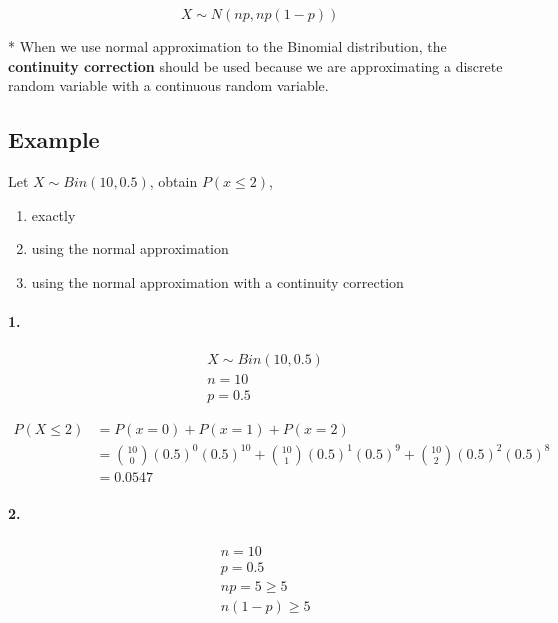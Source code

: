 \documentclass{article}
\begin{document}
    \begin{equation*}
        X \sim N(np, np(1-p))
    \end{equation*}

    * When we use normal approximation to the Binomial distribution, the \textbf{continuity correction} 
    should be used because we are approximating a discrete random variable with a continuous random variable.

    \subsection*{Example}
    Let $X \sim Bin(10, 0.5)$, obtain $P(x\leq 2)$,
    \begin{enumerate}
        \item exactly
        \item using the normal approximation
        \item using the normal approximation with a continuity correction
    \end{enumerate}

    \paragraph{1.}

    \begin{align*}
        &X \sim Bin(10, 0.5)\\
        &n = 10\\
        &p = 0.5
    \end{align*}

    \begin{align*}
        P(X \leq 2) &=  P(x = 0) + P(x = 1) + P(x = 2)\\
        & = {10 \choose 0 }(0.5)^{0}(0.5)^{10} + {10 \choose 1} (0.5)^{1}(0.5)^{9} + {10 \choose 2} (0.5)^{2}(0.5)^{8}\\
        & = 0.0547
    \end{align*}

    \paragraph{2.}
    \begin{align*}
        &n = 10\\
        &p = 0.5\\
        &np = 5 \geq 5\\
        &n(1-p) \geq 5
    \end{align*}
\end{document}
